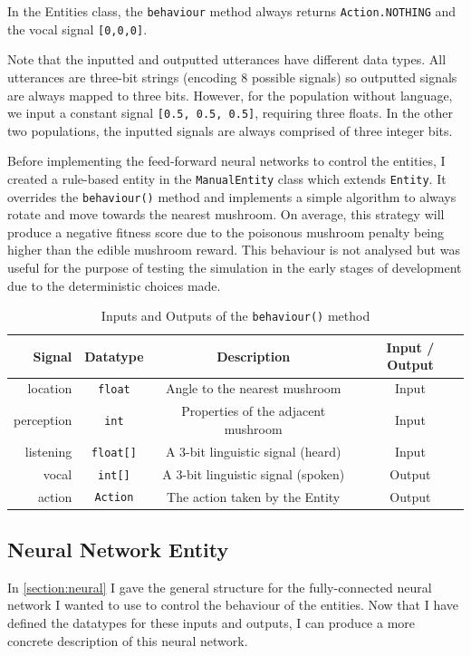 \documentclass[12pt,a4paper]{report}
\begin{document}
In the Entities class, the \texttt{behaviour} method always returns \texttt{Action.NOTHING} and the vocal signal \texttt{[0,0,0]}.

Note that the inputted and outputted utterances have different data types. All utterances are three-bit strings (encoding 8 possible signals) so outputted signals are always mapped to three bits. However, for the population without language, we input a constant signal \texttt{[0.5, 0.5, 0.5]}, requiring three floats. In the other two populations, the inputted  signals are always comprised of three integer bits.

Before implementing the feed-forward neural networks to control the entities, I created a rule-based entity in the \texttt{ManualEntity} class which extends \texttt{Entity}. It overrides the \texttt{behaviour()} method and implements a simple algorithm to always rotate and move towards the nearest mushroom. On average, this strategy will produce a negative fitness score due to the poisonous mushroom penalty being higher than the edible mushroom reward. This behaviour is not analysed but was useful for the purpose of testing the simulation in the early stages of development due to the deterministic choices made.

\begin{table}[t]
\centering
 \begin{tabular}{ r | c | c | c}
 \bf{Signal} & \bf{Datatype} & \bf{Description} & \bf{Input / Output} \\ [0.5ex] 
 \hline
location & \texttt{float} & Angle to the nearest mushroom & Input \\
perception & \texttt{int} & Properties of the adjacent mushroom & Input \\
listening & \texttt{float[]} & A 3-bit linguistic signal (heard) & Input \\
vocal & \texttt{int[]} & A 3-bit linguistic signal (spoken) & Output \\
action & \texttt{Action} & The action taken by the Entity & Output \\
\end{tabular}
\caption{Inputs and Outputs of the \texttt{behaviour()} method}
\label{table:behaviour}
\end{table}

\subsection{Neural Network Entity}

In \cref{section:neural} I gave the general structure for the fully-connected neural network I wanted to use to control the behaviour of the entities. Now that I have defined the datatypes for these inputs and outputs, I can produce a more concrete description of this neural network. 
\end{document}
